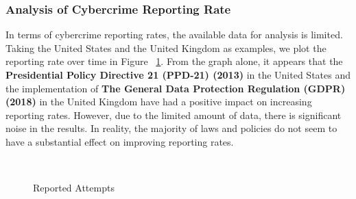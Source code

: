     \subsubsection*{Analysis of Cybercrime Reporting Rate} %
        In terms of cybercrime reporting rates, the available data for analysis is limited.
        Taking the United States and the United Kingdom as examples, we plot the reporting rate over time in Figure
        ~\ref{fig:reported-attempts}.
        From the graph alone, it appears that
        the \textbf{Presidential Policy Directive 21 (PPD-21) (2013)} in the United States and
        the implementation of \textbf{The General Data Protection Regulation (GDPR) (2018)}
        in the United Kingdom have had a positive impact on increasing reporting rates.
        However, due to the limited amount of data, there is significant noise in the results.
        In reality, the majority of laws and policies do not seem to have a substantial effect on improving reporting rates.
        \begin{figure}[htbp]
            \centering
            \hfill
            \\
            \caption{Reported Attempts}\label{fig:reported-attempts}
        \end{figure}

